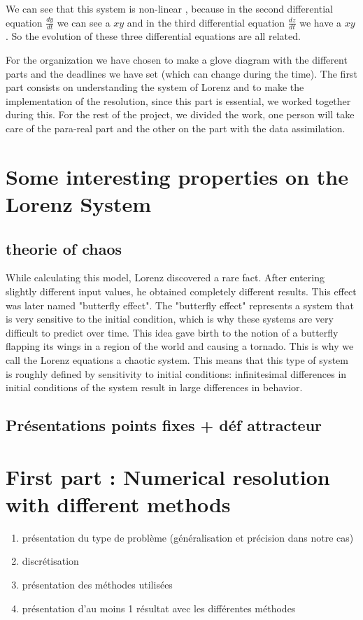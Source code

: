 \documentclass[12pt]{article}
\begin{document}
   We can see that this system is non-linear , because in the second differential equation $\frac{dy}{dt}$ we can see a $xy$ and in the third differential equation $\frac{dz}{dt}$ we have a $xy$ . So the evolution of these three differential equations are all related.
   
   For the organization we have chosen to make a glove diagram with the different parts and the deadlines we have set (which can change during the time). The first part consists on understanding the system of Lorenz and to make the implementation of the resolution, since this part is essential, we worked together during this. For the rest of the project, we divided the work, one person will take care of the para-real part and the other on the part with the data assimilation.



	
	
	\section{Some interesting properties on the Lorenz System}
	\subsection{theorie of chaos}
	
	While calculating this model, Lorenz discovered a rare fact. After entering slightly different input values, he obtained completely different results. This effect was later named "butterfly effect". The "butterfly effect" represents a system that is very sensitive to the initial condition, which is why these systems are very difficult to predict over time. This idea gave birth to the notion of a butterfly flapping its wings in a region of the world and causing a tornado.
    This is why we call the Lorenz equations a chaotic system. This means that this type of system is roughly defined by sensitivity to initial conditions: infinitesimal differences in initial conditions of the system result in large differences in behavior.

	\subsection{ Présentations points fixes + déf attracteur}
	
	\section{First part : Numerical resolution with different methods}
	
	\begin{enumerate}[label=\textbullet]
		\item présentation du type de problème (généralisation et précision dans notre cas)
		\item discrétisation
		\item présentation des méthodes utilisées
		\item présentation d'au moins 1 résultat avec les différentes méthodes
	\end{enumerate}
\end{document}
